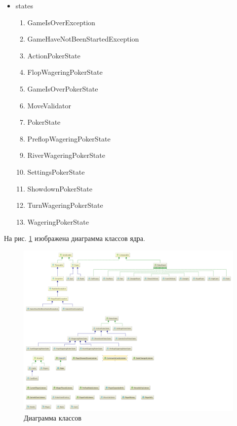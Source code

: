 \begin{itemize}
\begin{enumerate}
\end{enumerate}

\item states

\begin{enumerate}

\item GameIsOverException
\item GameHaveNotBeenStartedException
\item ActionPokerState
\item FlopWageringPokerState
\item GameIsOverPokerState
\item MoveValidator
\item PokerState
\item PreflopWageringPokerState
\item RiverWageringPokerState
\item SettingsPokerState
\item ShowdownPokerState
\item TurnWageringPokerState
\item WageringPokerState

\end{enumerate}

\end{itemize}

На рис. \ref{pic:core:1} изображена диаграмма классов ядра.


\begin{figure}[H]
	\begin{center}
		\includegraphics[scale=0.28]{pics/class_diagram.png}
	    \caption{Диаграмма классов} 
		\label{pic:core:1}
	\end{center}
\end{figure}

